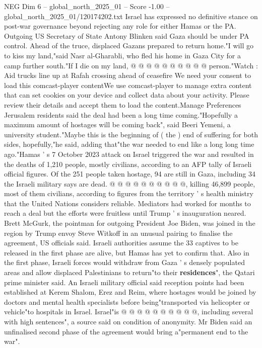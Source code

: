 \begin{textsample}{NEG Dim 6 – global\_north\_2025\_01 – Score -1.00 – global\_north\_2025\_01/120174202.txt}
Israel has expressed no definitive stance on post-war governance beyond rejecting any role for either Hamas or the PA.
Outgoing US Secretary of State Antony Blinken said Gaza should be under PA control.
Ahead of the truce, displaced Gazans prepared to return home."I will go to kiss my land,"said Nasr al-Gharabli, who fled his home in Gaza City for a camp further south."If I die on my land, @ @ @ @ @ @ @ @ @ @ person."Watch : Aid trucks line up at Rafah crossing ahead of ceasefire We need your consent to load this comcast-player contentWe use comcast-player to manage extra content that can set cookies on your device and collect data about your activity.
Please review their details and accept them to load the content.Manage Preferences Jerusalem residents said the deal had been a long time coming."Hopefully a maximum amount of hostages will be coming back", said Beeri Yemeni, a university student."Maybe this is the beginning of ( the ) end of suffering for both sides, hopefully,"he said, adding that"the war needed to end like a long long time ago."Hamas ' s 7 October 2023 attack on Israel triggered the war and resulted in the deaths of 1,210 people, mostly civilians, according to an AFP tally of Israeli official figures.
Of the 251 people taken hostage, 94 are still in Gaza, including 34 the Israeli military says are dead. @ @ @ @ @ @ @ @ @ @, killing 46,899 people, most of them civilians, according to figures from the territory ' s health ministry that the United Nations considers reliable.
Mediators had worked for months to reach a deal but the efforts were fruitless until Trump ' s inauguration neared.
Brett McGurk, the pointman for outgoing President Joe Biden, was joined in the region by Trump envoy Steve Witkoff in an unusual pairing to finalise the agreement, US officials said.
Israeli authorities assume the 33 captives to be released in the first phase are alive, but Hamas has yet to confirm that.
Also in the first phase, Israeli forces would withdraw from Gaza ' s densely populated areas and allow displaced Palestinians to return"to their \textbf{residences}", the Qatari prime minister said.
An Israeli military official said reception points had been established at Kerem Shalom, Erez and Reim, where hostages would be joined by doctors and mental health specialists before being"transported via helicopter or vehicle"to hospitals in Israel.
Israel"is @ @ @ @ @ @ @ @ @ @, including several with high sentences", a source said on condition of anonymity.
Mr Biden said an unfinalised second phase of the agreement would bring a"permanent end to the war".

\end{textsample}
